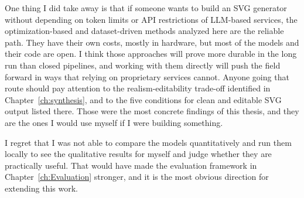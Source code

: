 One thing I did take away is that if someone 
wants to build an SVG generator without depending on 
token limits or API restrictions of LLM-based services, 
the optimization-based and dataset-driven methods 
analyzed here are the reliable path. They have their own 
costs, mostly in hardware, but most of the models 
and their code are open. I think those approaches will 
prove more durable in the long run than closed 
pipelines, and working with them directly will push the 
field forward in ways that relying on proprietary 
services cannot. Anyone going that route should pay 
attention to the realism-editability trade-off 
identified in Chapter~\ref{ch:synthesis}, and to the 
five conditions for clean and editable SVG output 
listed there. Those were the most concrete findings of 
this thesis, and they are the ones I would use myself 
if I were building something.

I regret that I was not able to compare the models 
quantitatively and run them locally to see the qualitative results 
for myself and judge whether they are practically 
useful. That would have made the evaluation framework 
in Chapter~\ref{ch:Evaluation} stronger, and it is the 
most obvious direction for extending this work.
